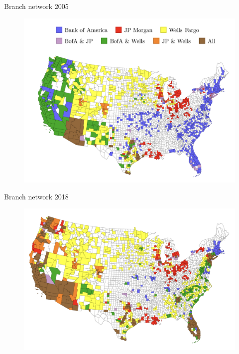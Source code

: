 \documentclass[notes,10.2pt, aspectratio=169]{beamer}
\begin{document}
\begin{frame}{Branch network 2005}
  \vspace{0.1cm}

\begin{figure}[t*]
\centering
\includegraphics[width=.65\textwidth]{./imgs/figure5a.png}
\end{figure}


\end{frame}

\begin{frame}{Branch network 2018}
  \vspace{0.1cm}

\begin{figure}[t*]
\centering
\includegraphics[width=.65\textwidth]{./imgs/figure5b.png}
\end{figure}


\end{frame}
\end{document}
